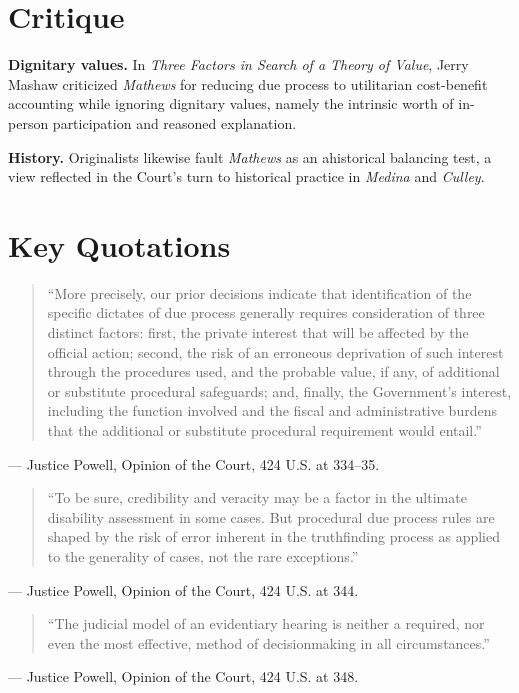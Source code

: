 \documentclass[12pt]{article}
\begin{document}
\section{Critique}

\textbf{Dignitary values.} In \textit{Three Factors in Search of a Theory of Value}, Jerry Mashaw criticized \textit{Mathews} for reducing due process to utilitarian cost-benefit accounting while ignoring dignitary values, namely the intrinsic worth of in-person participation and reasoned explanation.

\textbf{History.} Originalists likewise fault \textit{Mathews} as an ahistorical balancing test, a view reflected in the Court's turn to historical practice in \textit{Medina} and \textit{Culley}.

\section{Key Quotations}

\begin{quote}
``More precisely, our prior decisions indicate that identification of the specific dictates of due process generally requires consideration of three distinct factors: first, the private interest that will be affected by the official action; second, the risk of an erroneous deprivation of such interest through the procedures used, and the probable value, if any, of additional or substitute procedural safeguards; and, finally, the Government's interest, including the function involved and the fiscal and administrative burdens that the additional or substitute procedural requirement would entail.''
\end{quote}
\noindent --- Justice Powell, Opinion of the Court, 424 U.S. at 334--35.

\begin{quote}
``To be sure, credibility and veracity may be a factor in the ultimate disability assessment in some cases. But procedural due process rules are shaped by the risk of error inherent in the truthfinding process as applied to the generality of cases, not the rare exceptions.''
\end{quote}
\noindent --- Justice Powell, Opinion of the Court, 424 U.S. at 344.

\begin{quote}
``The judicial model of an evidentiary hearing is neither a required, nor even the most effective, method of decisionmaking in all circumstances.''
\end{quote}
\noindent --- Justice Powell, Opinion of the Court, 424 U.S. at 348.
\end{document}
